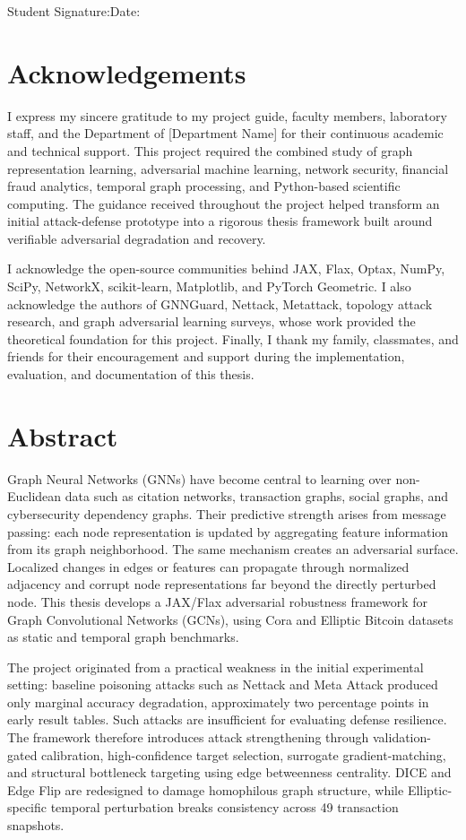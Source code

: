 \documentclass[12pt,oneside]{report}
\begin{document}
\vspace{0.8in}
\noindent Student Signature:\hfill Date:\hspace{1.2in}

\chapter*{Acknowledgements}
I express my sincere gratitude to my project guide, faculty members, laboratory staff, and the Department of [Department Name] for their continuous academic and technical support. This project required the combined study of graph representation learning, adversarial machine learning, network security, financial fraud analytics, temporal graph processing, and Python-based scientific computing. The guidance received throughout the project helped transform an initial attack-defense prototype into a rigorous thesis framework built around verifiable adversarial degradation and recovery.

I acknowledge the open-source communities behind JAX, Flax, Optax, NumPy, SciPy, NetworkX, scikit-learn, Matplotlib, and PyTorch Geometric. I also acknowledge the authors of GNNGuard, Nettack, Metattack, topology attack research, and graph adversarial learning surveys, whose work provided the theoretical foundation for this project. Finally, I thank my family, classmates, and friends for their encouragement and support during the implementation, evaluation, and documentation of this thesis.

\chapter*{Abstract}
Graph Neural Networks (GNNs) have become central to learning over non-Euclidean data such as citation networks, transaction graphs, social graphs, and cybersecurity dependency graphs. Their predictive strength arises from message passing: each node representation is updated by aggregating feature information from its graph neighborhood. The same mechanism creates an adversarial surface. Localized changes in edges or features can propagate through normalized adjacency and corrupt node representations far beyond the directly perturbed node. This thesis develops a JAX/Flax adversarial robustness framework for Graph Convolutional Networks (GCNs), using Cora and Elliptic Bitcoin datasets as static and temporal graph benchmarks.

The project originated from a practical weakness in the initial experimental setting: baseline poisoning attacks such as Nettack and Meta Attack produced only marginal accuracy degradation, approximately two percentage points in early result tables. Such attacks are insufficient for evaluating defense resilience. The framework therefore introduces attack strengthening through validation-gated calibration, high-confidence target selection, surrogate gradient-matching, and structural bottleneck targeting using edge betweenness centrality. DICE and Edge Flip are redesigned to damage homophilous graph structure, while Elliptic-specific temporal perturbation breaks consistency across 49 transaction snapshots.
\end{document}
